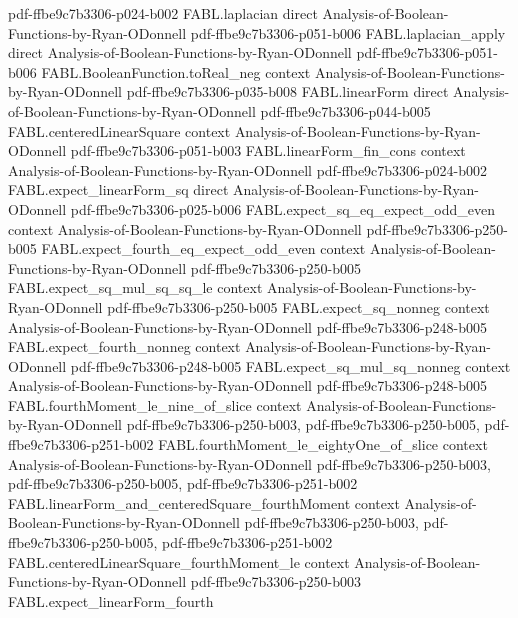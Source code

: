 \begin{theorem}
  {pdf-ffbe9c7b3306-p024-b002}
\proofstep
  {FABL.laplacian}
  {direct}
  {Analysis-of-Boolean-Functions-by-Ryan-ODonnell}
  {pdf-ffbe9c7b3306-p051-b006}
\proofstep
  {FABL.laplacian_apply}
  {direct}
  {Analysis-of-Boolean-Functions-by-Ryan-ODonnell}
  {pdf-ffbe9c7b3306-p051-b006}
\proofstep
  {FABL.BooleanFunction.toReal_neg}
  {context}
  {Analysis-of-Boolean-Functions-by-Ryan-ODonnell}
  {pdf-ffbe9c7b3306-p035-b008}
\proofstep
  {FABL.linearForm}
  {direct}
  {Analysis-of-Boolean-Functions-by-Ryan-ODonnell}
  {pdf-ffbe9c7b3306-p044-b005}
\proofstep
  {FABL.centeredLinearSquare}
  {context}
  {Analysis-of-Boolean-Functions-by-Ryan-ODonnell}
  {pdf-ffbe9c7b3306-p051-b003}
\proofstep
  {FABL.linearForm_fin_cons}
  {context}
  {Analysis-of-Boolean-Functions-by-Ryan-ODonnell}
  {pdf-ffbe9c7b3306-p024-b002}
\proofstep
  {FABL.expect_linearForm_sq}
  {direct}
  {Analysis-of-Boolean-Functions-by-Ryan-ODonnell}
  {pdf-ffbe9c7b3306-p025-b006}
\proofstep
  {FABL.expect_sq_eq_expect_odd_even}
  {context}
  {Analysis-of-Boolean-Functions-by-Ryan-ODonnell}
  {pdf-ffbe9c7b3306-p250-b005}
\proofstep
  {FABL.expect_fourth_eq_expect_odd_even}
  {context}
  {Analysis-of-Boolean-Functions-by-Ryan-ODonnell}
  {pdf-ffbe9c7b3306-p250-b005}
\proofstep
  {FABL.expect_sq_mul_sq_sq_le}
  {context}
  {Analysis-of-Boolean-Functions-by-Ryan-ODonnell}
  {pdf-ffbe9c7b3306-p250-b005}
\proofstep
  {FABL.expect_sq_nonneg}
  {context}
  {Analysis-of-Boolean-Functions-by-Ryan-ODonnell}
  {pdf-ffbe9c7b3306-p248-b005}
\proofstep
  {FABL.expect_fourth_nonneg}
  {context}
  {Analysis-of-Boolean-Functions-by-Ryan-ODonnell}
  {pdf-ffbe9c7b3306-p248-b005}
\proofstep
  {FABL.expect_sq_mul_sq_nonneg}
  {context}
  {Analysis-of-Boolean-Functions-by-Ryan-ODonnell}
  {pdf-ffbe9c7b3306-p248-b005}
\proofstep
  {FABL.fourthMoment_le_nine_of_slice}
  {context}
  {Analysis-of-Boolean-Functions-by-Ryan-ODonnell}
  {pdf-ffbe9c7b3306-p250-b003,
    pdf-ffbe9c7b3306-p250-b005,
    pdf-ffbe9c7b3306-p251-b002}
\proofstep
  {FABL.fourthMoment_le_eightyOne_of_slice}
  {context}
  {Analysis-of-Boolean-Functions-by-Ryan-ODonnell}
  {pdf-ffbe9c7b3306-p250-b003,
    pdf-ffbe9c7b3306-p250-b005,
    pdf-ffbe9c7b3306-p251-b002}
\proofstep
  {FABL.linearForm_and_centeredSquare_fourthMoment}
  {context}
  {Analysis-of-Boolean-Functions-by-Ryan-ODonnell}
  {pdf-ffbe9c7b3306-p250-b003,
    pdf-ffbe9c7b3306-p250-b005,
    pdf-ffbe9c7b3306-p251-b002}
\proofstep
  {FABL.centeredLinearSquare_fourthMoment_le}
  {context}
  {Analysis-of-Boolean-Functions-by-Ryan-ODonnell}
  {pdf-ffbe9c7b3306-p250-b003}
\proofstep
  {FABL.expect_linearForm_fourth}

\end{theorem}

